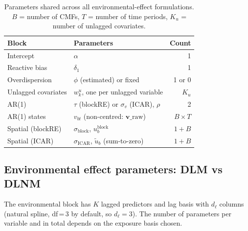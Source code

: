 \documentclass[12pt,a4paper]{article}
\begin{document}
\begin{table}[ht]
\centering
\small
\begin{tabular}{p{3cm}p{7cm}r}
\toprule
\textbf{Block} & \textbf{Parameters} & \textbf{Count} \\
\midrule
Intercept & $\alpha$ & 1 \\
Reactive bias & $\delta_1$ & 1 \\
Overdispersion & $\phi$ (estimated) or fixed & 1 or 0 \\
Unlagged covariates & $w_k^u$, one per unlagged variable & $K_u$ \\
AR(1) & $\tau$ (blockRE) or $\sigma_v$ (ICAR), $\rho$ & 2 \\
AR(1) states & $v_{bt}$ (non-centred: $\mathbf{v}\_\text{raw}$) & $B \times T$ \\
Spatial (blockRE) & $\sigma_\text{block}$, $u^\text{block}_{b}$ & $1 + B$ \\
Spatial (ICAR) & $\sigma_\text{ICAR}$, $\tilde{u}_b$ (sum-to-zero) & $1 + B$ \\
\bottomrule
\end{tabular}
\caption{Parameters shared across all environmental-effect formulations. $B$ = number of CMFs, $T$ = number of time periods, $K_u$ = number of unlagged covariates.}
\end{table}

\subsection*{Environmental effect parameters: DLM vs DLNM}

The environmental block has $K$ lagged predictors and lag basis with $d_\ell$ columns (natural spline, df\,=\,3 by default, so $d_\ell = 3$). The number of parameters per variable and in total depends on the exposure basis chosen.
\end{document}
